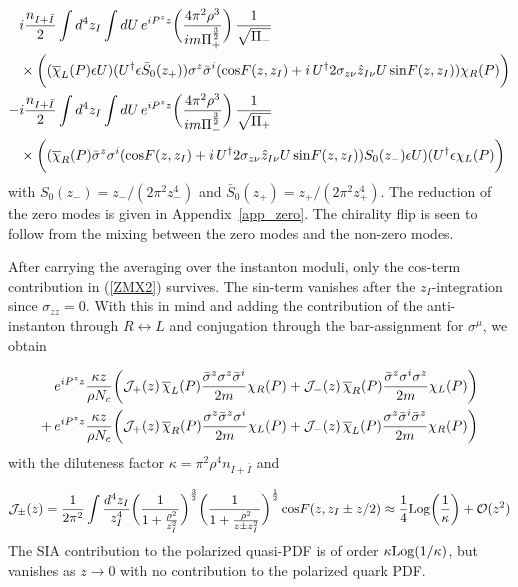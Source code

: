 \documentclass[11pt,aps,amsmath,amssymb,nofootinbib,notitlepage,longbibliography]{revtex4-1}
\newcommand{\bea}{\begin{eqnarray}}
\newcommand{\eea}{\end{eqnarray}}
\begin{document}
\begin{align}
\label{ZMX2}
&i\frac{n_{I+\bar I}}{2}\int d^4z_{I}\int dU \,e^{iP^zz}\bigg(\frac{4\pi^2\rho^3}{im\Pi_+^{\frac 32}}\bigg)\,\frac 1{\sqrt{\Pi_-}}\nonumber\\
&\times\bigg((\overline\chi_L(P)\epsilon U)(U^\dagger \epsilon \bar S_0(z_+))\sigma^z\bar\sigma^i
({\rm cos}F(z, z_I)+i\,U^\dagger 2\sigma_{z\nu}\hat z_{I\nu}U\,{\rm sin}F(z, z_I))\chi_R(P)\bigg)\nonumber\\
-&i\frac{n_{I+\bar I}}{2}\int d^4z_{I}\int dU \,e^{iP^zz}\bigg(\frac{4\pi^2\rho^3}{im\Pi_-^{\frac 32}}\bigg)\,\frac 1{\sqrt{\Pi_+}}\nonumber\\
&\times\bigg((\overline\chi_R(P)\bar \sigma^z\sigma^i
({\rm cos}F(z, z_I)+i\,U^\dagger 2\sigma_{z\nu}\hat z_{I\nu}U\,{\rm sin}F(z, z_I)) S_0(z_-)\epsilon U)(U^\dagger\epsilon \chi_L(P)\bigg)
\end{align}
with $S_0(z_-)=z_-/(2\pi^2z_-^4)$  and $\bar S_0(z_+)=z_+/(2\pi^2z_+^4)$. The reduction of the zero modes is given in Appendix~\ref{app_zero}.
The chirality flip is seen to follow from the mixing between the zero modes and the non-zero modes.


After carrying the averaging over the instanton moduli, only the  cos-term  contribution in (\ref{ZMX2})  survives.
The sin-term vanishes after the $z_I$-integration since $\sigma_{zz}=0$.
With this in mind and adding the contribution of the anti-instanton through $R\leftrightarrow L$ and conjugation
through the bar-assignment for $\sigma^\mu$, we obtain

\begin{align}
\label{ZMX3}
&e^{iP^zz}\frac {\kappa z}{\rho N_c}
\bigg({\cal J}_+(z)\,\overline\chi_L(P)\frac {\bar\sigma^z\sigma^z\bar\sigma^i}{2m}\chi_R(P)+{\cal J}_-(z)\,
\overline\chi_R(P)\frac{\bar\sigma^z\sigma^i\sigma^z}{2m}\chi_L(P)\bigg)\nonumber\\
+\,&e^{iP^zz}\frac {\kappa z}{\rho N_c}
\bigg({\cal J}_+(z)\,\overline\chi_R(P)\frac {\sigma^z\bar\sigma^z\sigma^i}{2m}\chi_L(P)+{\cal J}_-(z)\,
\overline\chi_L(P)\frac{\sigma^z\bar\sigma^i\bar\sigma^z}{2m}\chi_R(P)\bigg)
\end{align}
with the diluteness factor $\kappa=\pi^2\rho^4n_{I+\bar I}$ and

\bea
{\cal J}_\pm(z)=\frac 1{2\pi^2}\int \frac{d^4z_I}{z^4_I}\bigg(\frac 1{1+\frac{\rho^2}{z_I^2}}\bigg)^{\frac 32}
\bigg(\frac 1{1+\frac{\rho^2}{z\pm z_I^2}}\bigg)^{\frac 12}\,{\rm cos}F(z, z_I\pm z/2)\approx \frac 14{\rm Log}\bigg(\frac 1\kappa\bigg)+{\cal O}(z^2)\nonumber\\
\eea
The SIA contribution to the polarized quasi-PDF is of order $\kappa{\rm Log}(1/\kappa)$, but vanishes as  $z\rightarrow 0$ with no contribution to the polarized quark  PDF.
\end{document}
